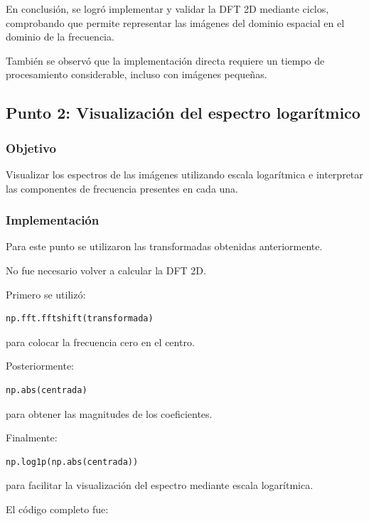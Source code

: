 \documentclass[11pt,letterpaper]{article}
\begin{document}
En conclusión, se logró implementar y validar
la DFT 2D mediante ciclos, comprobando que
permite representar las imágenes del dominio
espacial en el dominio de la frecuencia.

También se observó que la implementación directa
requiere un tiempo de procesamiento considerable,
incluso con imágenes pequeñas.

\subsection{Punto 2: Visualización del espectro logarítmico}

\subsubsection*{Objetivo}

Visualizar los espectros de las imágenes
utilizando escala logarítmica e interpretar
las componentes de frecuencia presentes
en cada una.

\subsubsection*{Implementación}

Para este punto se utilizaron las transformadas
obtenidas anteriormente.

No fue necesario volver a calcular
la DFT 2D.

Primero se utilizó:

\begin{lstlisting}
np.fft.fftshift(transformada)
\end{lstlisting}

para colocar la frecuencia cero en el centro.

Posteriormente:

\begin{lstlisting}
np.abs(centrada)
\end{lstlisting}

para obtener las magnitudes de los coeficientes.

Finalmente:

\begin{lstlisting}
np.log1p(np.abs(centrada))
\end{lstlisting}

para facilitar la visualización del espectro
mediante escala logarítmica.

El código completo fue:
\end{document}
